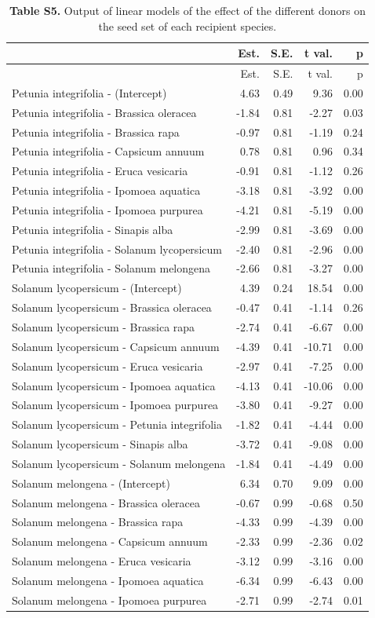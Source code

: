 \documentclass[
  12pt,
]{article}
\begin{document}
\begin{longtable}[]{@{}lrrrr@{}}
\caption{\textbf{Table S5.} Output of linear models of the effect of the
different donors on the seed set of each recipient
species.}\tabularnewline
\toprule
& Est. & S.E. & t val. & p\tabularnewline
\midrule
\endfirsthead
\toprule
& Est. & S.E. & t val. & p\tabularnewline
\midrule
\endhead
Petunia integrifolia - (Intercept) & 4.63 & 0.49 & 9.36 &
0.00\tabularnewline
Petunia integrifolia - Brassica oleracea & -1.84 & 0.81 & -2.27 &
0.03\tabularnewline
Petunia integrifolia - Brassica rapa & -0.97 & 0.81 & -1.19 &
0.24\tabularnewline
Petunia integrifolia - Capsicum annuum & 0.78 & 0.81 & 0.96 &
0.34\tabularnewline
Petunia integrifolia - Eruca vesicaria & -0.91 & 0.81 & -1.12 &
0.26\tabularnewline
Petunia integrifolia - Ipomoea aquatica & -3.18 & 0.81 & -3.92 &
0.00\tabularnewline
Petunia integrifolia - Ipomoea purpurea & -4.21 & 0.81 & -5.19 &
0.00\tabularnewline
Petunia integrifolia - Sinapis alba & -2.99 & 0.81 & -3.69 &
0.00\tabularnewline
Petunia integrifolia - Solanum lycopersicum & -2.40 & 0.81 & -2.96 &
0.00\tabularnewline
Petunia integrifolia - Solanum melongena & -2.66 & 0.81 & -3.27 &
0.00\tabularnewline
Solanum lycopersicum - (Intercept) & 4.39 & 0.24 & 18.54 &
0.00\tabularnewline
Solanum lycopersicum - Brassica oleracea & -0.47 & 0.41 & -1.14 &
0.26\tabularnewline
Solanum lycopersicum - Brassica rapa & -2.74 & 0.41 & -6.67 &
0.00\tabularnewline
Solanum lycopersicum - Capsicum annuum & -4.39 & 0.41 & -10.71 &
0.00\tabularnewline
Solanum lycopersicum - Eruca vesicaria & -2.97 & 0.41 & -7.25 &
0.00\tabularnewline
Solanum lycopersicum - Ipomoea aquatica & -4.13 & 0.41 & -10.06 &
0.00\tabularnewline
Solanum lycopersicum - Ipomoea purpurea & -3.80 & 0.41 & -9.27 &
0.00\tabularnewline
Solanum lycopersicum - Petunia integrifolia & -1.82 & 0.41 & -4.44 &
0.00\tabularnewline
Solanum lycopersicum - Sinapis alba & -3.72 & 0.41 & -9.08 &
0.00\tabularnewline
Solanum lycopersicum - Solanum melongena & -1.84 & 0.41 & -4.49 &
0.00\tabularnewline
Solanum melongena - (Intercept) & 6.34 & 0.70 & 9.09 &
0.00\tabularnewline
Solanum melongena - Brassica oleracea & -0.67 & 0.99 & -0.68 &
0.50\tabularnewline
Solanum melongena - Brassica rapa & -4.33 & 0.99 & -4.39 &
0.00\tabularnewline
Solanum melongena - Capsicum annuum & -2.33 & 0.99 & -2.36 &
0.02\tabularnewline
Solanum melongena - Eruca vesicaria & -3.12 & 0.99 & -3.16 &
0.00\tabularnewline
Solanum melongena - Ipomoea aquatica & -6.34 & 0.99 & -6.43 &
0.00\tabularnewline
Solanum melongena - Ipomoea purpurea & -2.71 & 0.99 & -2.74 &
0.01\tabularnewline

\end{longtable}
\end{document}
